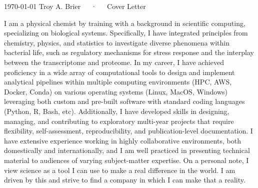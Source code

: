 \documentclass[11pt, a4paper]{awesome-cv}
\begin{document}
	\makecvheader[R]
	\makecvfooter
	{\today}
	{Troy A. Brier~~~·~~~Cover Letter}
	{}
	\makelettertitle
	\begin{cvletter}

		I am a physical chemist by training with a background in scientific computing, specializing on biological systems.
		Specifically, I have integrated principles from chemistry, physics, and statistics to investigate diverse phenomena within bacterial life, such as regulatory mechanisms for stress response and the interplay between the transcriptome and proteome.	
		In my career, I have achieved proficiency in a wide array of computational tools to design and implement analytical pipelines within multiple computing environments (HPC, AWS, Docker, Conda) on various operating systems (Linux, MacOS, Windows) leveraging both custom and pre-built software with standard coding languages (Python, R, Bash, etc).
		Additionally, I have developed skills in designing, managing, and contributing to exploratory multi-year projects that require flexibility, self-assessment, reproducibility, and publication-level documentation.
		I have extensive experience working in highly collaborative environments, both domestically and internationally, and I am well practiced in presenting technical material to audiences of varying subject-matter expertise. On a personal note, I view science as a tool I can use to make a real difference in the world. I am driven by this and strive to find a company in which I can make that a reality. %
		

\end{cvletter}
\end{document}

